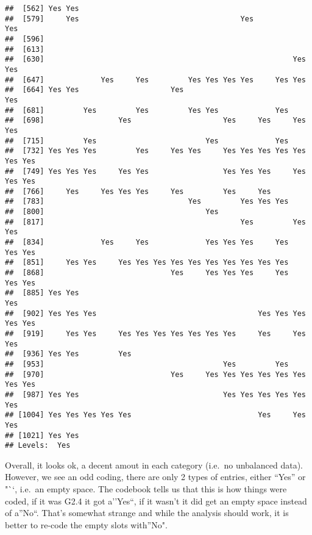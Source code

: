\documentclass[]{article}
\begin{document}
\begin{verbatim}
##  [562] Yes Yes                                                            
##  [579]     Yes                                     Yes             Yes    
##  [596]                                                                    
##  [613]                                                                    
##  [630]                                                         Yes Yes    
##  [647]             Yes     Yes         Yes Yes Yes Yes     Yes Yes        
##  [664] Yes Yes                     Yes                                 Yes
##  [681]         Yes         Yes         Yes Yes             Yes            
##  [698]                 Yes                     Yes     Yes     Yes Yes    
##  [715]         Yes                         Yes             Yes            
##  [732] Yes Yes Yes         Yes     Yes Yes     Yes Yes Yes Yes Yes Yes Yes
##  [749] Yes Yes Yes     Yes Yes                 Yes Yes Yes     Yes Yes Yes
##  [766]     Yes     Yes Yes Yes     Yes         Yes     Yes                
##  [783]                                 Yes         Yes Yes Yes            
##  [800]                                     Yes                            
##  [817]                                             Yes         Yes Yes    
##  [834]             Yes     Yes             Yes Yes Yes     Yes     Yes Yes
##  [851]     Yes Yes     Yes Yes Yes Yes Yes Yes Yes Yes Yes Yes            
##  [868]                             Yes     Yes Yes Yes     Yes     Yes Yes
##  [885] Yes Yes                                                         Yes
##  [902] Yes Yes Yes                                     Yes Yes Yes Yes Yes
##  [919]     Yes Yes     Yes Yes Yes Yes Yes Yes Yes     Yes     Yes Yes    
##  [936] Yes Yes         Yes                                                
##  [953]                                         Yes         Yes            
##  [970]                             Yes     Yes Yes Yes Yes Yes Yes Yes Yes
##  [987] Yes Yes                                 Yes Yes Yes Yes Yes Yes    
## [1004] Yes Yes Yes Yes Yes                             Yes     Yes     Yes
## [1021] Yes Yes
## Levels:  Yes
\end{verbatim}

Overall, it looks ok, a decent amout in each category (i.e.~no
unbalanced data). However, we see an odd coding, there are only 2 types
of entries, either ``Yes'' or "``, i.e.~an empty space. The codebook
tells us that this is how things were coded, if it was G2.4 it got
a''Yes``, if it wasn't it did get an empty space instead of a''No``.
That's somewhat strange and while the analysis should work, it is better
to re-code the empty slots with''No".
\end{document}
